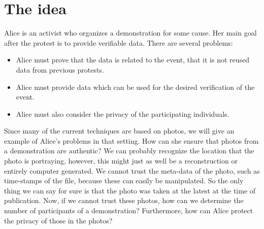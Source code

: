 \mode*
\section{The idea}%
\label{TheIdea}

Alice is an activist who organizes a demonstration for some cause.
Her main goal after the protest is to provide verifiable data.
There are several problems:
\begin{frame}
\begin{itemize}
  \item Alice must prove that the data is related to the event, that it is not 
    reused data from previous protests.
  \item Alice must provide data which can be used for the desired verification 
    of the event.
  \item Alice must also consider the privacy of the participating individuals.
\end{itemize}
\end{frame}
Since many of the current techniques are based on photos, we will give an 
example of Alice's problems in that setting.
How can she ensure that photos from a demonstration are authentic?
We can probably recognize the location that the photo is portraying, however, 
this might just as well be a reconstruction or entirely computer generated.
We cannot trust the meta-data of the photo, such as time-stamps of the file, 
because these can easily be manipulated.
So the only thing we can say for sure is that the photo was taken at the latest 
at the time of publication.
Now, if we cannot trust these photos, how can we determine the number of 
participants of a demonstration?
Furthermore, how can Alice protect the privacy of those in the photos?

%
%
%

